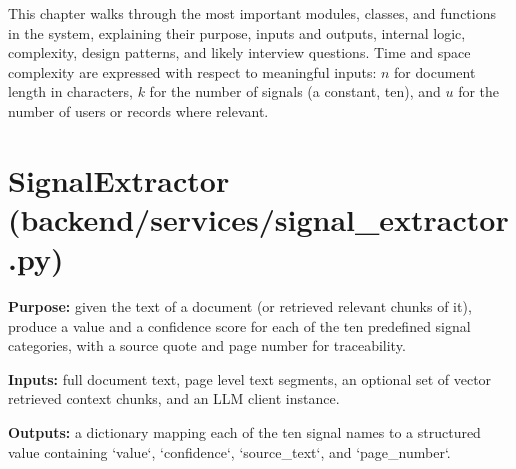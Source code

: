 \documentclass[11pt,a4paper]{report}
\begin{document}
This chapter walks through the most important modules, classes, and functions in the system, explaining their purpose, inputs and outputs, internal logic, complexity, design patterns, and likely interview questions. Time and space complexity are expressed with respect to meaningful inputs: $n$ for document length in characters, $k$ for the number of signals (a constant, ten), and $u$ for the number of users or records where relevant.

\section{SignalExtractor (backend/services/signal\_extractor.py)}

\textbf{Purpose:} given the text of a document (or retrieved relevant chunks of it), produce a value and a confidence score for each of the ten predefined signal categories, with a source quote and page number for traceability.

\textbf{Inputs:} full document text, page level text segments, an optional set of vector retrieved context chunks, and an LLM client instance.

\textbf{Outputs:} a dictionary mapping each of the ten signal names to a structured value containing `value`, `confidence`, `source_text`, and `page_number`.
\end{document}
